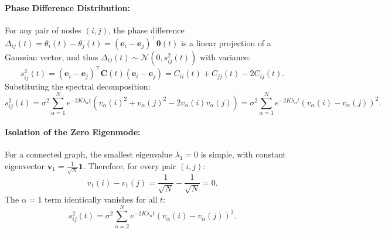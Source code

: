 \paragraph{Phase Difference Distribution:}
For any pair of nodes $(i,j)$, the phase difference $\Delta_{ij}(t) = \theta_i(t) - \theta_j(t) = (\mathbf{e}_i - \mathbf{e}_j)^\top \bm\theta(t)$ is a linear projection of a Gaussian vector, and thus $\Delta_{ij}(t) \sim \mathcal{N}(0, s_{ij}^2(t))$ with variance:
\begin{equation}
s_{ij}^2(t) = (\mathbf{e}_i - \mathbf{e}_j)^\top \mathbf{C}(t) (\mathbf{e}_i - \mathbf{e}_j) = C_{ii}(t) + C_{jj}(t) - 2 C_{ij}(t).
\end{equation}
Substituting the spectral decomposition:
\begin{equation}
s_{ij}^2(t) = \sigma^2 \sum_{\alpha=1}^N e^{-2K\lambda_\alpha t} \left( v_\alpha(i)^2 + v_\alpha(j)^2 - 2 v_\alpha(i) v_\alpha(j) \right) 
= \sigma^2 \sum_{\alpha=1}^N e^{-2K\lambda_\alpha t} \left( v_\alpha(i) - v_\alpha(j) \right)^2.
\end{equation}

\paragraph{Isolation of the Zero Eigenmode:}
For a connected graph, the smallest eigenvalue $\lambda_1 = 0$ is simple, with constant eigenvector $\mathbf{v}_1 = \frac{1}{\sqrt{N}} \mathbf{1}$. Therefore, for every pair $(i, j)$:
\begin{equation}
v_1(i) - v_1(j) = \frac{1}{\sqrt{N}} - \frac{1}{\sqrt{N}} = 0.
\end{equation}
The $\alpha = 1$ term identically vanishes for all $t$:
\begin{equation}
s_{ij}^2(t) = \sigma^2 \sum_{\alpha=2}^N e^{-2K\lambda_\alpha t} \left( v_\alpha(i) - v_\alpha(j) \right)^2.
\end{equation}

